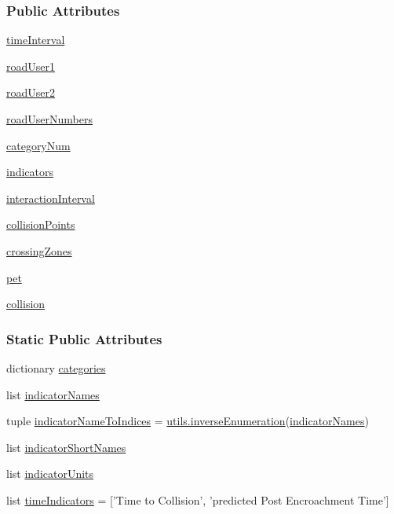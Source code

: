 \subsubsection*{Public Attributes}
\begin{DoxyCompactItemize}
\item 
\hyperlink{classevents_1_1Interaction_acd9ac2aa2b8a71bb1718a3ee5899018b}{time\-Interval}
\item 
\hyperlink{classevents_1_1Interaction_a9a04846f8cf171f10f28d7eeb225d4be}{road\-User1}
\item 
\hyperlink{classevents_1_1Interaction_a65694843a89a3c452dd88e5a5f42a81e}{road\-User2}
\item 
\hyperlink{classevents_1_1Interaction_a9b1791b28fc1fce202bcd20ae43165cd}{road\-User\-Numbers}
\item 
\hyperlink{classevents_1_1Interaction_a151a6e0a5240a1f59d6210502c12d3cd}{category\-Num}
\item 
\hyperlink{classevents_1_1Interaction_a63550a0bfc7e2276b72ecaaf4958ab5e}{indicators}
\item 
\hyperlink{classevents_1_1Interaction_a25090186ae70b1e409228b7e4ed174b4}{interaction\-Interval}
\item 
\hyperlink{classevents_1_1Interaction_adcbf2b6e0bae45140323d94565c61354}{collision\-Points}
\item 
\hyperlink{classevents_1_1Interaction_aabeafe12aba2ff523496001e85042e51}{crossing\-Zones}
\item 
\hyperlink{classevents_1_1Interaction_a21c2eb7375a31ee4d6dd2ede7be622ae}{pet}
\item 
\hyperlink{classevents_1_1Interaction_a542128c09df1352263c53fd059a5b190}{collision}
\end{DoxyCompactItemize}
\subsubsection*{Static Public Attributes}
\begin{DoxyCompactItemize}
\item 
dictionary \hyperlink{classevents_1_1Interaction_af006771e67847af6c5ca1f8f7fa46a3d}{categories}
\item 
list \hyperlink{classevents_1_1Interaction_a573cc05c1d659e0d5912b3eb2361d43f}{indicator\-Names}
\item 
tuple \hyperlink{classevents_1_1Interaction_aed1115f38b9e2d6154ffa22d4c3c3455}{indicator\-Name\-To\-Indices} = \hyperlink{namespaceutils_ad6e2839437b1cc265f6c89f24780e3de}{utils.\-inverse\-Enumeration}(\hyperlink{classevents_1_1Interaction_a573cc05c1d659e0d5912b3eb2361d43f}{indicator\-Names})
\item 
list \hyperlink{classevents_1_1Interaction_a85329e433b60d0b41c12c51634ff95fa}{indicator\-Short\-Names}
\item 
list \hyperlink{classevents_1_1Interaction_aab56132b6523d94fd27317ebeb1e7fd2}{indicator\-Units}
\item 
list \hyperlink{classevents_1_1Interaction_a4925b91d8a26d5f6e6e7e488009ed5ad}{time\-Indicators} = \mbox{[}'Time to Collision', 'predicted Post Encroachment Time'\mbox{]}
\end{DoxyCompactItemize}


